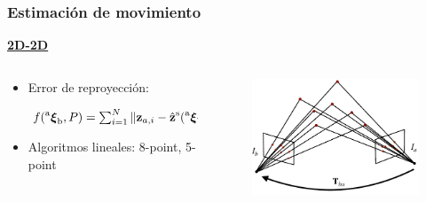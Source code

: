\begin{frame}
    \frametitle{Estimación de movimiento}
    \scriptsize
    
    \underline{\textbf{2D-2D}}
    
    \begin{columns}
        \begin{column}{0.7\textwidth}
            \begin{itemize}
            \item Error de reproyección:
            \begin{center}
                $f(\prescript{\mathrm{a}}{}{{\boldsymbol{\mathbf{\xi}}}_\mathrm{b}}, P)= \sum_{i=1}^{N} \Vert \boldsymbol{\mathbf{z}}_{a,i} - \hat{\boldsymbol{\mathbf{z}}}^{\mathrm{s}}(\prescript{\mathrm{a}}{}{{\boldsymbol{\mathbf{\xi}}}_\mathrm{\mathrm{W}}},\prescript{\mathrm{\mathrm{W}}}{}{\boldsymbol{\mathbf{p}}}_{i}) \Vert^{2} + \Vert \boldsymbol{\mathbf{z}}_{b,i} - \hat{\boldsymbol{\mathbf{z}}}^{\mathrm{s}}({\prescript{\mathrm{a}}{}{{\boldsymbol{\mathbf{\xi}}}_\mathrm{b}}}^{-1}\prescript{\mathrm{a}}{}{{\boldsymbol{\mathbf{\xi}}}_\mathrm{\mathrm{W}}},\prescript{\mathrm{\mathrm{W}}}{}{\boldsymbol{\mathbf{p}}}_{i}) \Vert^{2}$
            \end{center}
            \item Algoritmos lineales: 8-point, 5-point
            \end{itemize}
        \end{column}
        \begin{column}{0.3\textwidth}
            \begin{figure}
                \includegraphics[width=0.5\columnwidth]{./images/localization_2d_2d.pdf}
            \end{figure}
        \end{column}
    \end{columns}


\end{frame}
